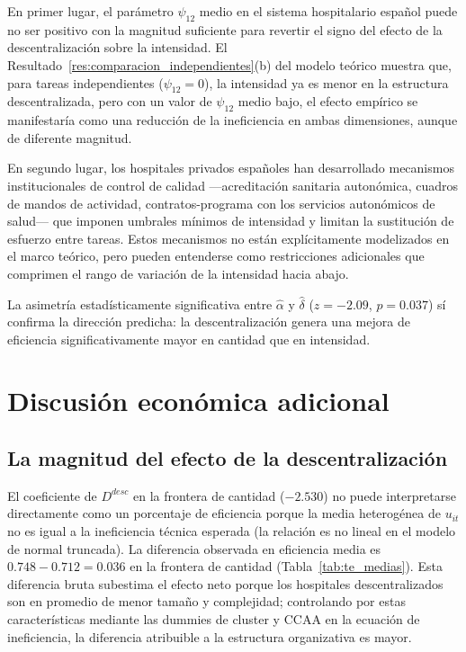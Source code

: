 En primer lugar, el parámetro $\psi_{12}$ medio en el sistema hospitalario español puede no ser positivo con la magnitud suficiente para revertir el signo del efecto de la descentralización sobre la intensidad. El Resultado~\ref{res:comparacion_independientes}(b) del modelo teórico muestra que, para tareas independientes ($\psi_{12}=0$), la intensidad ya es menor en la estructura descentralizada, pero con un valor de $\psi_{12}$ medio bajo, el efecto empírico se manifestaría como una reducción de la ineficiencia en ambas dimensiones, aunque de diferente magnitud.

En segundo lugar, los hospitales privados españoles han desarrollado mecanismos institucionales de control de calidad ---acreditación sanitaria autonómica, cuadros de mandos de actividad, contratos-programa con los servicios autonómicos de salud--- que imponen umbrales mínimos de intensidad y limitan la sustitución de esfuerzo entre tareas. Estos mecanismos no están explícitamente modelizados en el marco teórico, pero pueden entenderse como restricciones adicionales que comprimen el rango de variación de la intensidad hacia abajo.

La asimetría estadísticamente significativa entre $\hat{\alpha}$ y $\hat{\delta}$ ($z=-2.09$, $p=0.037$) sí confirma la dirección predicha: la descentralización genera una mejora de eficiencia significativamente mayor en cantidad que en intensidad.

\section{Discusión económica adicional}
\label{sec:discusion_economica}

\subsection{La magnitud del efecto de la descentralización}

El coeficiente de $D^{desc}$ en la frontera de cantidad ($-2.530$) no puede interpretarse directamente como un porcentaje de eficiencia porque la media heterogénea de $u_{it}$ no es igual a la ineficiencia técnica esperada (la relación es no lineal en el modelo de normal truncada). La diferencia observada en eficiencia media es $0.748 - 0.712 = 0.036$ en la frontera de cantidad (Tabla~\ref{tab:te_medias}). Esta diferencia bruta subestima el efecto neto porque los hospitales descentralizados son en promedio de menor tamaño y complejidad; controlando por estas características mediante las dummies de cluster y CCAA en la ecuación de ineficiencia, la diferencia atribuible a la estructura organizativa es mayor.

